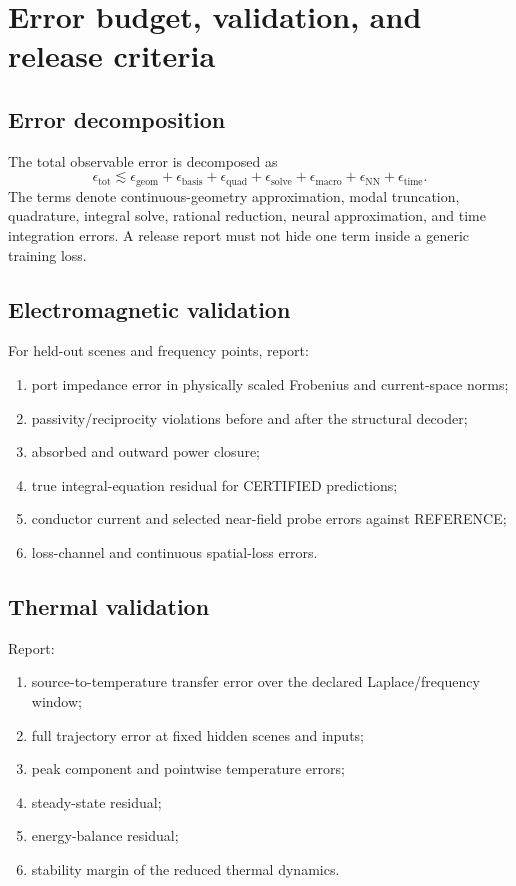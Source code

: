 \section{Error budget, validation, and release criteria}

\subsection{Error decomposition}

The total observable error is decomposed as
\[
 \epsilon_{\mathrm{tot}}
 \lesssim
 \epsilon_{\mathrm{geom}}
 +\epsilon_{\mathrm{basis}}
 +\epsilon_{\mathrm{quad}}
 +\epsilon_{\mathrm{solve}}
 +\epsilon_{\mathrm{macro}}
 +\epsilon_{\mathrm{NN}}
 +\epsilon_{\mathrm{time}}.
\]
The terms denote continuous-geometry approximation, modal truncation,
quadrature, integral solve, rational reduction, neural approximation, and time
integration errors. A release report must not hide one term inside a generic
training loss.

\subsection{Electromagnetic validation}

For held-out scenes and frequency points, report:
\begin{enumerate}
\item port impedance error in physically scaled Frobenius and current-space
      norms;
\item passivity/reciprocity violations before and after the structural decoder;
\item absorbed and outward power closure;
\item true integral-equation residual for CERTIFIED predictions;
\item conductor current and selected near-field probe errors against REFERENCE;
\item loss-channel and continuous spatial-loss errors.
\end{enumerate}

\subsection{Thermal validation}

Report:
\begin{enumerate}
\item source-to-temperature transfer error over the declared Laplace/frequency
      window;
\item full trajectory error at fixed hidden scenes and inputs;
\item peak component and pointwise temperature errors;
\item steady-state residual;
\item energy-balance residual;
\item stability margin of the reduced thermal dynamics.
\end{enumerate}

